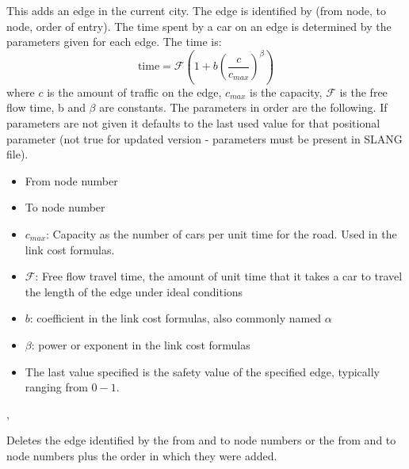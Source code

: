 \documentclass[11pt]{article}
\begin{document}
\begin{enumerate}
This adds an edge in the current city.   The edge is identified by (from node, to node, order of entry).  The time spent by a car on an edge is determined by the
parameters given for each edge.   The time is:
\[
\textrm{time} = \mathcal{F} \left( 1 + b \left(\frac{c}{c_{max}}\right)^\beta \right)
\]
where $c$ is the amount of traffic on the edge, $c_{max}$ is the capacity,
$\mathcal{F}$ is the free flow time, b and $\beta$ are constants.
The parameters in order are the following.   If parameters are not given it defaults to the last used value for that positional parameter (not true for updated version - parameters must be present in SLANG file).
\begin{itemize}
\item From node number
\item To node number
\item $c_{max}$: Capacity as the number of cars per unit time for the road.  Used in the link cost formulas.
\item $\mathcal{F}$: Free flow travel time, the amount of unit time that it takes a car to travel the length of the edge under ideal conditions
\item $b$: coefficient in the link cost formulas, also commonly named $\alpha$
\item $\beta$: power or exponent in the link cost formulas
\item The last value specified is the safety value of the specified edge, typically ranging from $0-1$.

\end{itemize}

\production {} \arr {}   \sep \\
\smgap  {}   

Deletes the edge identified by the from and to node numbers or the from and to node numbers plus
the order in which they were added.

\production {} \arr {}      


\end{enumerate}
\end{document}
